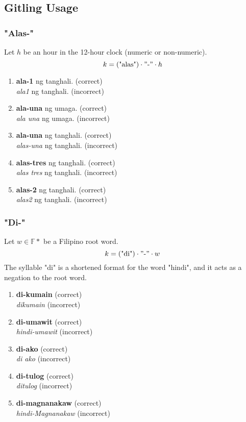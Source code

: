 \subsection{Gitling Usage}

\subsubsection{"Alas-"}
Let \(h\) be an hour in the 12-hour clock (numeric or non-numeric).
\[
      k = (\text{"alas"}) \cdot "\text{-}" \cdot h
\]
\begin{example}
\end{example}
\begin{enumerate}
      \item \textbf{ala-1} ng tanghali. (correct) \\
            \textit{ala1} ng tanghali. (incorrect)
      \item \textbf{ala-una} ng umaga. (correct) \\
            \textit{ala una} ng umaga. (incorrect)
      \item \textbf{ala-una} ng tanghali. (correct) \\
            \textit{alas-una} ng tanghali. (incorrect)
      \item \textbf{alas-tres} ng tanghali. (correct) \\
            \textit{alas tres} ng tanghali. (incorrect)
      \item \textbf{alas-2} ng tanghali. (correct) \\
            \textit{alas2} ng tanghali. (incorrect)
\end{enumerate}

\subsubsection{"Di-"}

Let \(w \in \mathbb{F}*\) be a Filipino root word.
\[
      k = (\text{"di"}) \cdot "\text{-}" \cdot w
\]
The syllable "di" is a shortened format for the word "hindi", and it acts as a negation to the root word.
\begin{example}
\end{example}
\begin{enumerate}
      \item \textbf{di-kumain} (correct) \\
            \textit{dikumain} (incorrect)
      \item \textbf{di-umawit} (correct) \\
            \textit{hindi-umawit} (incorrect)
      \item \textbf{di-ako} (correct) \\
            \textit{di ako} (incorrect)
      \item \textbf{di-tulog} (correct) \\
            \textit{ditulog} (incorrect)
      \item \textbf{di-magnanakaw} (correct) \\
            \textit{hindi-Magnanakaw} (incorrect)
\end{enumerate}

